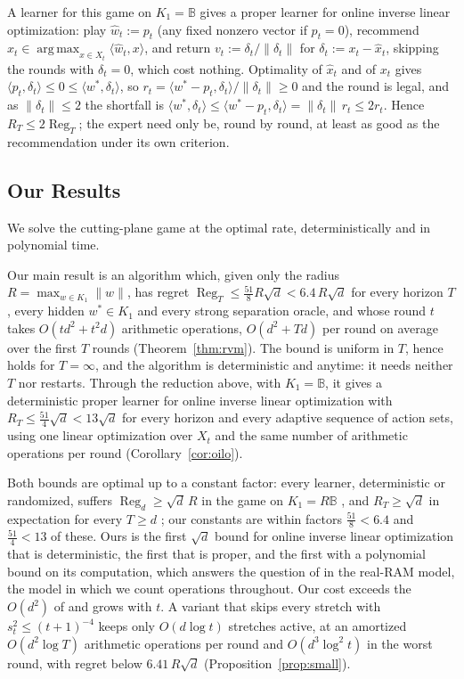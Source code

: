 \documentclass[11pt]{article}
\theoremstyle{plain}
\theoremstyle{definition}
\theoremstyle{remark}
\DeclareMathOperator{\Reg}{Reg}
\DeclareMathOperator*{\argmax}{arg\,max}
\newcommand{\Ball}{\mathbb{B}}
\newcommand{\wstar}{w^{\ast}}
\newcommand{\ip}[2]{\langle #1, #2\rangle}
\begin{document}
A learner for this game on $K_1=\Ball$ gives a proper learner for online inverse linear
optimization: play $\hat w_t:=p_t$ (any fixed nonzero vector if $p_t=0$), recommend
$\hat x_t\in\argmax_{x\in X_t}\ip{\hat w_t}{x}$, and return $v_t:=\delta_t/\|\delta_t\|$ for
$\delta_t:=x_t-\hat x_t$, skipping the rounds with $\delta_t=0$, which cost nothing. Optimality of
$\hat x_t$ and of $x_t$ gives $\ip{p_t}{\delta_t}\le0\le\ip{\wstar}{\delta_t}$, so
$r_t=\ip{\wstar-p_t}{\delta_t}/\|\delta_t\|\ge0$ and the round is legal, and as $\|\delta_t\|\le2$
the shortfall is $\ip{\wstar}{\delta_t}\le\ip{\wstar-p_t}{\delta_t}=\|\delta_t\|\,r_t\le2r_t$. Hence
$R_T\le2\Reg_T$; the expert need only be, round by round, at least as good as the recommendation
under its own criterion.

\subsection{Our Results}\label{sec:results}

We solve the cutting-plane game at the optimal rate, deterministically and in polynomial time.

Our main result is an algorithm which, given only the radius $R=\max_{w\in K_1}\|w\|$, has regret
$\Reg_T\le\tfrac{51}{8}R\sqrt d<6.4\,R\sqrt d$ for every horizon $T$, every hidden $\wstar\in K_1$
and every strong separation oracle, and whose round $t$ takes $O(td^{2}+t^{2}d)$ arithmetic
operations, $O(d^{2}+Td)$ per round on average over the first $T$ rounds
(Theorem~\ref{thm:rvm}). The bound is uniform in $T$, hence holds for $T=\infty$, and the algorithm
is deterministic and anytime: it needs neither $T$ nor restarts. Through the reduction above, with
$K_1=\Ball$, it gives a deterministic proper learner for online inverse linear optimization with
$R_T\le\tfrac{51}{4}\sqrt d<13\sqrt d$ for every horizon and every adaptive sequence of action sets,
using one linear optimization over $X_t$ and the same number of arithmetic operations per round
(Corollary~\ref{cor:oilo}).

Both bounds are optimal up to a constant factor: every learner, deterministic or randomized, suffers
$\Reg_d\ge\sqrt d\,R$ in the game on $K_1=R\Ball$ \cite[Theorem~3.1]{Cai26}, and $R_T\ge\sqrt d$ in
expectation for every $T\ge d$ \cite{SakaueONS,SakaueMMW}; our constants are within factors
$\tfrac{51}{8}<6.4$ and $\tfrac{51}{4}<13$ of these. Ours is the first $\sqrt d$ bound for online
inverse linear optimization that is deterministic, the first that is proper, and the first with a
polynomial bound on its computation, which answers the question of \cite{SakaueMMW} in the real-RAM
model, the model in which we count operations throughout. Our cost exceeds the $O(d^{2})$ of
\cite{Cai26} and grows with $t$. A variant that skips every stretch with $s_t^{2}\le(t+1)^{-4}$
keeps only $O(d\log t)$ stretches active, at an amortized $O(d^{2}\log T)$ arithmetic operations per
round and $O(d^{3}\log^{2}t)$ in the worst round, with regret below $6.41\,R\sqrt d$
(Proposition~\ref{prop:small}).
\end{document}
